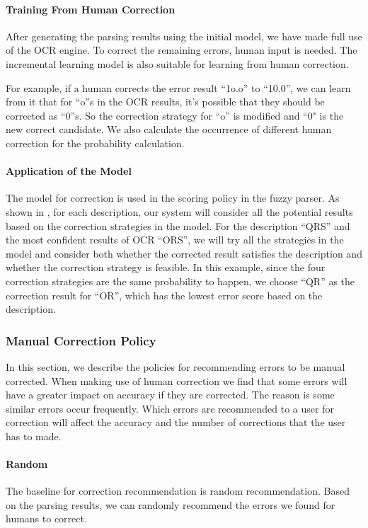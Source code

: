 \paragraph{Training From Human Correction}
After generating the parsing results using the initial model, we have
made full use of the OCR engine. To correct the remaining errors,
human input is needed. The incremental learning model is also suitable
for learning from human correction.

For example, if a human corrects the error result ``1o.o'' to ``10.0'',
we can learn from it that for ``o''s in the OCR results, it's possible that
they should be corrected as ``0''s. So the correction strategy
for ``o'' is modified and ``0" is the new correct candidate.
We also calculate the occurrence
of different human correction for the probability calculation.

\paragraph{Application of the Model}
The model for correction is used in the scoring policy in the
fuzzy parser. As shown in , for each
description, our system will consider all the potential
results based on the correction strategies in the model.
For the description ``QRS'' and the most confident results
of OCR ``ORS'', we will try all the strategies in the model
and consider both whether the corrected result satisfies the
description and whether the correction strategy is
feasible. In this example, since the four correction strategies
are the same probability to happen, we choose ``QR'' as the correction
result for ``OR'',
which has the lowest error score based on the description.

\subsubsection{Manual Correction Policy}
In this section, we describe the policies for recommending
errors to be manual corrected. When making use of human correction
we find that some errors will have a greater impact on
accuracy if they are corrected. The reason is some similar errors
occur frequently. Which errors are recommended to a user
for correction will affect the accuracy and the
number of corrections that the user has to made.

\paragraph{Random}
The baseline for correction recommendation is random
recommendation. Based on the parsing results, we can randomly
recommend the errors we found for humans to correct.

